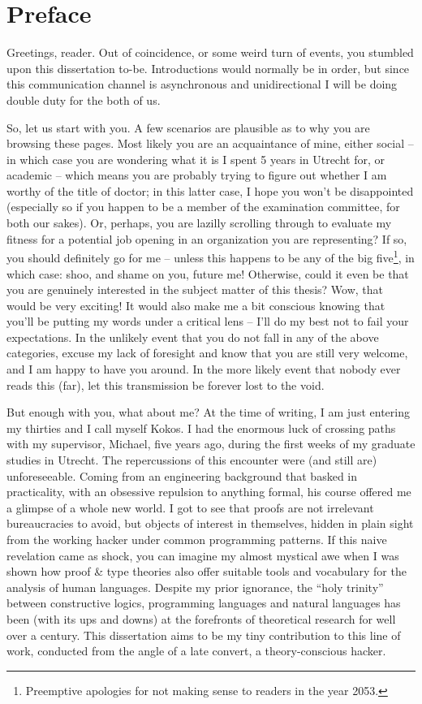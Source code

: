 \chapter*{Preface}

Greetings, reader. Out of coincidence, or some weird turn of events, you stumbled upon this dissertation to-be. 
Introductions would normally be in order, but since this communication channel is asynchronous and unidirectional I will be doing double duty for the both of us.

So, let us start with you. 
A few scenarios are plausible as to why you are browsing these pages. 
Most likely you are an acquaintance of mine, either social – in which case you are wondering what it is I spent 5 years in Utrecht for, or academic – which means you are probably trying to figure out whether I am worthy of the title of doctor; 
in this latter case, I hope you won’t be disappointed (especially so if you happen to be a member of the examination committee, for both our sakes).
Or, perhaps, you are lazilly scrolling through to evaluate my fitness for a potential job opening in an organization you are representing? 
If so, you should definitely go for me – unless this happens to be any of the big five\footnote{Preemptive
apologies for not making sense to readers in the year 2053.}, in which case: shoo, and shame on you, future me!
Otherwise, could it even be that you are genuinely interested in the subject matter of this thesis? 
Wow, that would be very exciting! 
It would also make me a bit conscious knowing that you’ll be putting my words under a critical lens – I’ll do my best not to fail your expectations. 
In the unlikely event that you do not fall in any of the above categories, excuse my lack of foresight and know that you are still very welcome, and I am happy to have you around. 
In the more likely event that nobody ever reads this (far), let this transmission be forever lost to the void.

But enough with you, what about me? 
At the time of writing, I am just entering my thirties and I call myself Kokos. 
I had the enormous luck of crossing paths with my supervisor, Michael, five years ago, during the first weeks of my graduate studies in Utrecht. 
The repercussions of this encounter were (and still are) unforeseeable. 
Coming from an engineering background that basked in practicality, with an obsessive repulsion to anything formal, his course offered me a glimpse of a whole new world. 
I got to see that proofs are not irrelevant bureaucracies to avoid, but objects of interest in themselves, hidden in plain sight from the working hacker under common programming patterns. 
If this naive revelation came as shock, you can imagine my almost mystical awe when I was shown how proof \& type theories also offer suitable tools and vocabulary for the analysis of human languages. 
Despite my prior ignorance, the “holy trinity” between constructive logics, programming languages and natural languages has been (with its ups and downs) at the forefronts of theoretical research for well over a century. 
This dissertation aims to be my tiny contribution to this line of work, conducted from the angle of a late convert, a theory-conscious hacker. 

